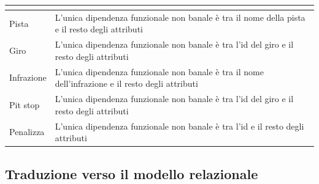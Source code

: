 \documentclass[11pt]{article}
\begin{document}
\begin{center}
\begin{tabular}{ |p{2cm}|p{14.5cm}| }
{        } \\
        \hline
        Pista & \par{L'unica dipendenza funzionale non banale è tra il nome della pista e il resto degli attributi} \\
        \hline
        Giro & \par{L'unica dipendenza funzionale non banale è tra l'id del giro e il resto degli attributi} \\
        \hline
        Infrazione & \par{L'unica dipendenza funzionale non banale è tra il nome dell'infrazione e il resto degli attributi} \\
        \hline
        Pit stop & \par{L'unica dipendenza funzionale non banale è tra l'id del giro e il resto degli attributi} \\
        \hline
        Penalizza & \par{L'unica dipendenza funzionale non banale è tra l'id e il resto degli attributi} \\
        \hline
    \end{tabular}
\end{center}

\subsection{Traduzione verso il modello relazionale}
\end{document}
